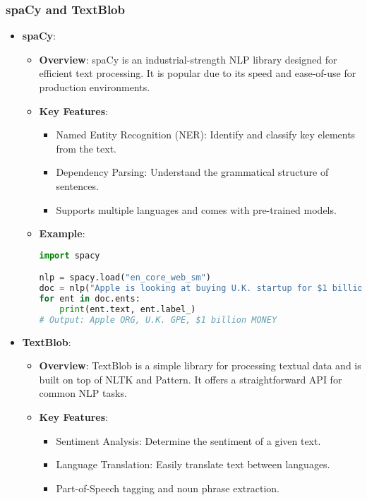 \documentclass[aspectratio=169]{beamer}
\begin{document}
\begin{frame}[fragile]
    \frametitle{spaCy and TextBlob}
    \begin{itemize}
        \item \textbf{spaCy}:
        \begin{itemize}
            \item \textbf{Overview}: spaCy is an industrial-strength NLP library designed for efficient text processing.
            It is popular due to its speed and ease-of-use for production environments.
            
            \item \textbf{Key Features}:
            \begin{itemize}
                \item Named Entity Recognition (NER): Identify and classify key elements from the text.
                \item Dependency Parsing: Understand the grammatical structure of sentences.
                \item Supports multiple languages and comes with pre-trained models.
            \end{itemize}

            \item \textbf{Example}:
            \begin{lstlisting}[language=Python]
import spacy

nlp = spacy.load("en_core_web_sm")
doc = nlp("Apple is looking at buying U.K. startup for $1 billion")
for ent in doc.ents:
    print(ent.text, ent.label_)  
# Output: Apple ORG, U.K. GPE, $1 billion MONEY
            \end{lstlisting}
        \end{itemize}
        
        \item \textbf{TextBlob}:
        \begin{itemize}
            \item \textbf{Overview}: TextBlob is a simple library for processing textual data and is built on top of NLTK and Pattern.
            It offers a straightforward API for common NLP tasks.
            
            \item \textbf{Key Features}:
            \begin{itemize}
                \item Sentiment Analysis: Determine the sentiment of a given text.
                \item Language Translation: Easily translate text between languages.
                \item Part-of-Speech tagging and noun phrase extraction.
            \end{itemize}
            

\end{itemize}
\end{itemize}
\end{frame}
\end{document}
